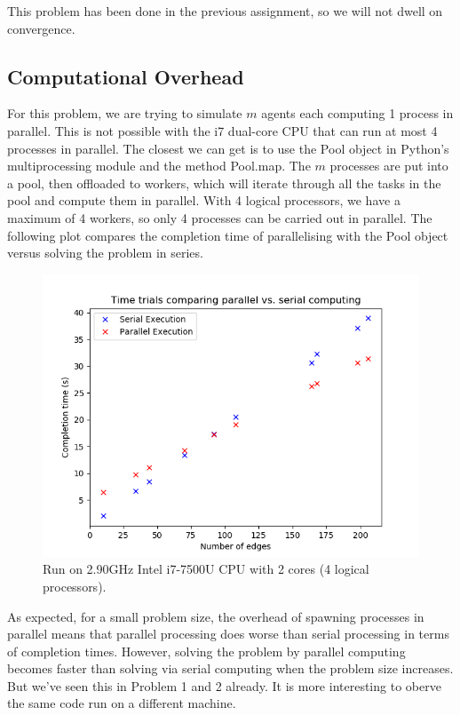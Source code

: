 \documentclass[12pt]{article}
\begin{document}
This problem has been done in the previous assignment, so we will not dwell on convergence.

\subsection*{Computational Overhead}

For this problem, we are trying to simulate $m$ agents each computing 1 process in parallel. This is not possible with the i7 dual-core CPU that can run at most 4 processes in parallel. The closest we can get is to use the Pool object in Python's multiprocessing module and the method Pool.map. The $m$ processes are put into a pool, then offloaded to workers, which will iterate through all the tasks in the pool and compute them in parallel. With 4 logical processors, we have a maximum of 4 workers, so only 4 processes can be carried out in parallel. The following plot compares the completion time of parallelising with the Pool object versus solving the problem in series.

\begin{figure}[H]
	\includegraphics[scale=1]{Problem3-TimeTrial.png}
	\caption{Run on 2.90GHz Intel i7-7500U CPU with 2 cores (4 logical processors).}
\end{figure}

As expected, for a small problem size, the overhead of spawning processes in parallel means that parallel processing does worse than serial processing in terms of completion times. However, solving the problem by parallel computing becomes faster than solving via serial computing when the problem size increases. But we've seen this in Problem 1 and 2 already. It is more interesting to oberve the same code run on a different machine.
\end{document}

